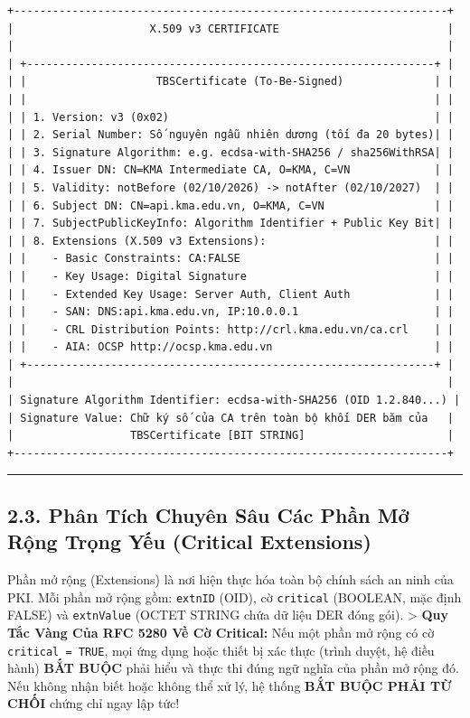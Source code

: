 \documentclass[
]{article}
\begin{document}
\begin{verbatim}
+-------------------------------------------------------------------+
|                     X.509 v3 CERTIFICATE                          |
|                                                                   |
| +---------------------------------------------------------------+ |
| |                    TBSCertificate (To-Be-Signed)              | |
| |                                                               | |
| | 1. Version: v3 (0x02)                                         | |
| | 2. Serial Number: Số nguyên ngẫu nhiên dương (tối đa 20 bytes)| |
| | 3. Signature Algorithm: e.g. ecdsa-with-SHA256 / sha256WithRSA| |
| | 4. Issuer DN: CN=KMA Intermediate CA, O=KMA, C=VN             | |
| | 5. Validity: notBefore (02/10/2026) -> notAfter (02/10/2027)  | |
| | 6. Subject DN: CN=api.kma.edu.vn, O=KMA, C=VN                 | |
| | 7. SubjectPublicKeyInfo: Algorithm Identifier + Public Key Bit| |
| | 8. Extensions (X.509 v3 Extensions):                          | |
| |    - Basic Constraints: CA:FALSE                              | |
| |    - Key Usage: Digital Signature                             | |
| |    - Extended Key Usage: Server Auth, Client Auth             | |
| |    - SAN: DNS:api.kma.edu.vn, IP:10.0.0.1                     | |
| |    - CRL Distribution Points: http://crl.kma.edu.vn/ca.crl    | |
| |    - AIA: OCSP http://ocsp.kma.edu.vn                         | |
| +---------------------------------------------------------------+ |
|                                                                   |
| Signature Algorithm Identifier: ecdsa-with-SHA256 (OID 1.2.840...) |
| Signature Value: Chữ ký số của CA trên toàn bộ khối DER băm của   |
|                  TBSCertificate [BIT STRING]                      |
+-------------------------------------------------------------------+
\end{verbatim}

\begin{center}\rule{0.5\linewidth}{0.5pt}\end{center}

\subsection{2.3. Phân Tích Chuyên Sâu Các Phần Mở Rộng Trọng Yếu
(Critical
Extensions)}\label{phuxe2n-tuxedch-chuyuxean-suxe2u-cuxe1c-phux1ea7n-mux1edf-rux1ed9ng-trux1ecdng-yux1ebfu-critical-extensions}

Phần mở rộng (Extensions) là nơi hiện thực hóa toàn bộ chính sách an
ninh của PKI. Mỗi phần mở rộng gồm: \texttt{extnID} (OID), cờ
\texttt{critical} (BOOLEAN, mặc định FALSE) và \texttt{extnValue} (OCTET
STRING chứa dữ liệu DER đóng gói). \textgreater{} \textbf{Quy Tắc Vàng
Của RFC 5280 Về Cờ Critical:} Nếu một phần mở rộng có cờ
\texttt{critical\ =\ TRUE}, mọi ứng dụng hoặc thiết bị xác thực (trình
duyệt, hệ điều hành) \textbf{BẮT BUỘC} phải hiểu và thực thi đúng ngữ
nghĩa của phần mở rộng đó. Nếu không nhận biết hoặc không thể xử lý, hệ
thống \textbf{BẮT BUỘC PHẢI TỪ CHỐI} chứng chỉ ngay lập tức!
\end{document}
